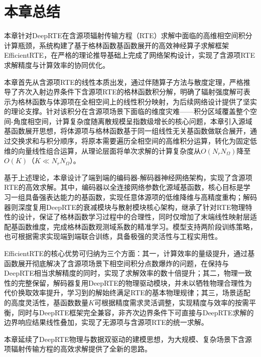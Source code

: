 \section{本章总结}

本章针对DeepRTE在含源项辐射传输方程（RTE）求解中面临的高维相空间积分计算瓶颈，系统构建了基于格林函数基函数展开的高效神经算子求解框架EfficientRTE，在严格的理论推导基础上完成了网络架构设计，实现了含源项RTE求解精度与计算效率的协同优化。

本章首先从含源项RTE的线性本质出发，通过伴随算子方法与散度定理，严格推导了齐次入射边界条件下含源项RTE的格林函数积分解，明确了辐射强度解可表示为格林函数与体源项在全相空间上的线性积分映射，为后续网络设计提供了坚实的理论支撑。针对该积分在含源项场景下面临的维度灾难——积分区域覆盖整个空间-角度相空间，计算复杂度随离散规模呈指数级增长的核心问题，本章引入源域基函数展开思想，将体源项与格林函数基于同一组线性无关基函数做联合展开，通过交换求和与积分顺序，将原本需要遍历全相空间的高维积分运算，转化为固定低维的向量线性组合运算，从理论层面将单次求解的计算复杂度从$O(N_r N_\Omega)$降至$O(K)$（$K \ll N_r N_\Omega$）。

基于上述理论，本章设计了端到端的编码器-解码器神经网络架构，实现了含源项RTE的高效求解。其中，编码器以全连接网络参数化源域基函数，核心目标是学习一组具备强表达能力的基函数，实现任意体源项的低维降维与高精度重构；解码器则深度复用DeepRTE的衰减模块与散射模块核心架构，继承了针对RTE物理特性的设计，保证了格林函数学习过程中的合理性，同时仅增加了末端线性映射层适配基函数维度，完成格林函数观测域系数的精准学习。模型支持两阶段训练策略，也可根据需求实现端到端联合训练，具备极强的灵活性与工程实用性。

EfficientRTE的核心优势可归纳为三个方面：其一，计算效率的量级提升，通过基函数展开彻底解决了含源项场景下相空间积分点数爆炸的问题，在保持与DeepRTE相当求解精度的同时，实现了求解效率的数十倍提升；其二，物理一致性的完整保留，解码器复用DeepRTE的物理驱动模块，并未以牺牲物理合理性为代价换取效率提升，学习到的解始终满足RTE的基本物理规律；其三，场景适配的高度灵活性，基函数数量$K$可根据精度需求灵活调整，实现精度与效率的按需平衡，同时与DeepRTE框架完全兼容，非齐次边界条件下可直接与DeepRTE求解的边界响应结果线性叠加，实现了无源项与含源项RTE的统一求解。

本章延续了DeepRTE物理与数据双驱动的建模思想，为大规模、复杂场景下含源项辐射传输方程的高效求解提供了全新的思路。